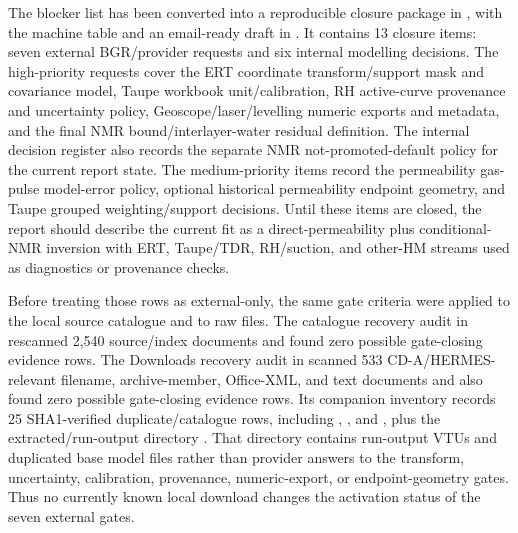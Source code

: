 The blocker list has been converted into a reproducible closure package in
, with the machine table
 and an email-ready draft
in .  It contains
13 closure items: seven external BGR/provider requests and six internal modelling
decisions.  The high-priority requests cover the ERT coordinate transform/support
mask and covariance model, Taupe workbook unit/calibration, RH active-curve
provenance and uncertainty policy, Geoscope/laser/levelling numeric exports and
metadata, and the final NMR bound/interlayer-water residual definition.  The
internal decision register also records the separate NMR not-promoted-default
policy for the current report state.
The medium-priority items record the permeability gas-pulse model-error policy, optional
historical permeability endpoint geometry, and Taupe grouped weighting/support
decisions.  Until these items are closed, the report should describe the current
fit as a direct-permeability plus conditional-NMR inversion with ERT, Taupe/TDR,
RH/suction, and other-HM streams used as diagnostics or provenance checks.

Before treating those rows as external-only, the same gate criteria were applied to
the local source catalogue and to raw  files.  The
catalogue recovery audit in
 rescanned 2,540 source/index
documents and found zero possible gate-closing evidence rows.  The Downloads recovery
audit in  scanned 533
CD-A/HERMES-relevant filename, archive-member, Office-XML, and text documents and
also found zero possible gate-closing evidence rows.  Its companion inventory
 records 25
SHA1-verified duplicate/catalogue rows, including
, , and
, plus the extracted/run-output directory
.  That directory contains run-output
VTUs and duplicated base model files rather than provider answers to the transform,
uncertainty, calibration, provenance, numeric-export, or endpoint-geometry gates.
Thus no currently known local download changes the activation status of the seven
external gates.


